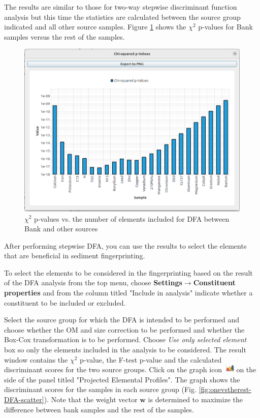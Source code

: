 \documentclass[12pt]{report}
\begin{document}
The results are similar to those for two-way stepwise discriminant function analysis but this time the statistics are calculated between the source group indicated and all other source samples. Figure \ref{fig:Chi2-DFA-onevsrest} shows the $\chi^2$ p-values for Bank samples versus the rest of the samples. 

\begin{figure}[ht]
    \centering
    \includegraphics[width=14cm]{Figures/Chi2p-value-stepwise-onevstherest-DFA.png}
    \caption{$\chi^2$ p-values vs. the number of elements included for DFA between Bank and other sources}
    \label{fig:Chi2-DFA-onevsrest}
\end{figure}
\FloatBarrier

After performing stepwise DFA, you can use the results to select the elements that are beneficial in sediment fingerprinting. 

To select the elements to be considered in the fingerprinting based on the result of the DFA analysis from the top menu, choose \textbf{Settings}$\rightarrow$\textbf{Constituent properties} and from the column titled "Include in analysis" indicate whether a constituent to be included or excluded. 

Select the source group for which the DFA is intended to be performed and choose whether the OM and size correction to be performed and whether the Box-Cox transformation is to be performed.  Choose \textit{Use only selected element} box so only the elements included in the analysis to be considered. The result window contains the $\chi^2$ p-value, the F-test p-value and the calculated discriminant scores for the two source groups. Click on the graph icon \includegraphics[width=0.5cm]{Figures/Graph.png} on the side of the panel titled "Projected Elemental Profiles". The graph shows the discriminant scores for the samples in each source group (Fig. \ref{fig:onevstherest-DFA-scatter}). Note that the weight vector $\mathbf{w}$ is determined to maximize the difference between bank samples and the rest of the samples. 
\end{document}
